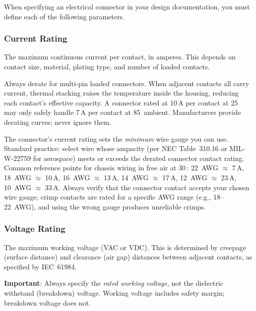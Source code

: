When specifying an electrical connector in your design documentation, you must define each of the following parameters.

\subsubsection{Current Rating}

The maximum continuous current per contact, in amperes. This depends on contact size, material, plating type, and number of loaded contacts. 

\begin{warningbox}
Always derate for multi-pin loaded connectors. When adjacent contacts all carry current, thermal stacking raises the temperature inside the housing, reducing each contact's effective capacity. A connector rated at 10\,A per contact at 25\,\degC{} may only safely handle 7\,A per contact at 85\,\degC{} ambient. Manufacturers provide derating curves; never ignore them.
\end{warningbox}

\begin{tipbox}
The connector's current rating sets the \emph{minimum} wire gauge you can use. Standard practice: select wire whose ampacity (per NEC Table~310.16 or MIL-W-22759 for aerospace) meets or exceeds the derated connector contact rating. Common reference points for chassis wiring in free air at 30\,\degC{}: 22~AWG $\approx$ 7\,A, 18~AWG $\approx$ 10\,A, 16~AWG $\approx$ 13\,A, 14~AWG $\approx$ 17\,A, 12~AWG $\approx$ 23\,A, 10~AWG $\approx$ 33\,A. Always verify that the connector contact accepts your chosen wire gauge; crimp contacts are rated for a specific AWG range (e.g., 18--22~AWG), and using the wrong gauge produces unreliable crimps.
\end{tipbox}

\subsubsection{Voltage Rating}

The maximum working voltage (VAC or VDC). This is determined by creepage (surface distance) and clearance (air gap) distances between adjacent contacts, as specified by IEC~61984. 

\textbf{Important}: Always specify the \emph{rated working voltage}, not the dielectric withstand (breakdown) voltage. Working voltage includes safety margin; breakdown voltage does not.


